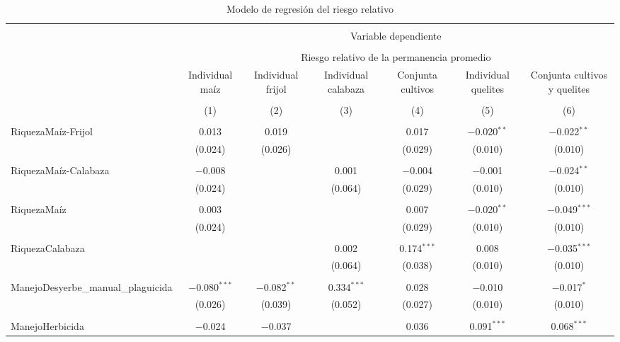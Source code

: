\documentclass[spanish,11pt]{article}
\begin{document}
\begin{table}[!htbp] \centering 
  \caption{Modelo de regresión del riesgo relativo} 
  \label{} 
\begin{tabular}{@{\extracolsep{5pt}}lcccccc} 
\\[-1.8ex]\hline 
\hline \\[-1.8ex] 
 & \multicolumn{6}{c}{Variable dependiente} \\ 
\cline{2-7} 
\\[-1.8ex] & \multicolumn{6}{c}{Riesgo relativo de la permanencia promedio} \\ 
 & Individual maíz & Individual frijol & Individual calabaza & Conjunta cultivos & Individual quelites & Conjunta cultivos y quelites \\ 
\\[-1.8ex] & (1) & (2) & (3) & (4) & (5) & (6)\\ 
\hline \\[-1.8ex] 
 RiquezaMaíz-Frijol & 0.013 & 0.019 &  & 0.017 & $-$0.020$^{**}$ & $-$0.022$^{**}$ \\ 
  & (0.024) & (0.026) &  & (0.029) & (0.010) & (0.010) \\ 
  & & & & & & \\ 
 RiquezaMaíz-Calabaza & $-$0.008 &  & 0.001 & $-$0.004 & $-$0.001 & $-$0.024$^{**}$ \\ 
  & (0.024) &  & (0.064) & (0.029) & (0.010) & (0.010) \\ 
  & & & & & & \\ 
 RiquezaMaíz & 0.003 &  &  & 0.007 & $-$0.020$^{**}$ & $-$0.049$^{***}$ \\ 
  & (0.024) &  &  & (0.029) & (0.010) & (0.010) \\ 
  & & & & & & \\ 
 RiquezaCalabaza &  &  & 0.002 & 0.174$^{***}$ & 0.008 & $-$0.035$^{***}$ \\ 
  &  &  & (0.064) & (0.038) & (0.010) & (0.010) \\ 
  & & & & & & \\ 
 ManejoDesyerbe\_manual\_plaguicida & $-$0.080$^{***}$ & $-$0.082$^{**}$ & 0.334$^{***}$ & 0.028 & $-$0.010 & $-$0.017$^{*}$ \\ 
  & (0.026) & (0.039) & (0.052) & (0.027) & (0.010) & (0.010) \\ 
  & & & & & & \\ 
 ManejoHerbicida & $-$0.024 & $-$0.037 &  & 0.036 & 0.091$^{***}$ & 0.068$^{***}$ \\ 

\end{tabular}
\end{table}
\end{document}
